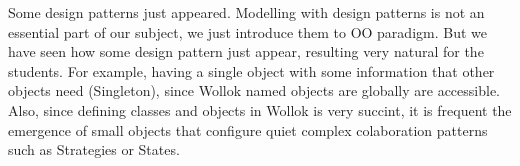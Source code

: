 Some design patterns just appeared. 
Modelling with design patterns is not an essential part of our subject, we just introduce them to OO paradigm. 
But we have seen how some design pattern just appear, resulting very natural for the students. 
For example, having a single object with some information that other objects need (Singleton), 
since Wollok named objects are globally are accessible.
Also, since defining classes and objects in Wollok is very succint, it is frequent the emergence of small objects that configure quiet complex colaboration patterns such as Strategies or States\cite{Gamm93b}.


